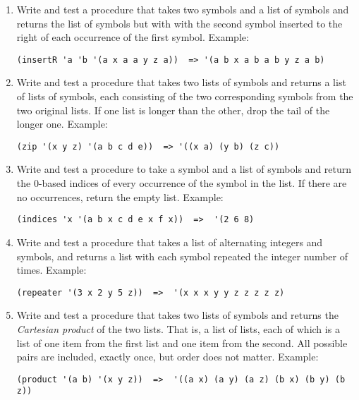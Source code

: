\documentclass[12pt]{article}
\newcommand{\li}{\item}
\begin{document}
\begin{enumerate}
\li Write and test a procedure that takes two symbols and a list
of symbols and returns the list of symbols but with
with the second symbol inserted to the right of
each occurrence of the first symbol.  Example:
\begin{lstlisting}
(insertR 'a 'b '(a x a a y z a))  => '(a b x a b a b y z a b)
\end{lstlisting}

\li Write and test a procedure that takes two lists
of symbols and returns a list of lists of symbols,
each consisting of the two 
corresponding symbols from the two original lists.
If one list is longer than the other, drop the tail of
the longer one.
 Example:
\begin{lstlisting}
(zip '(x y z) '(a b c d e))  => '((x a) (y b) (z c))
\end{lstlisting}

\li Write and test a procedure to take a symbol and a list
of symbols and return the 0-based indices of every occurrence
of the symbol in the list.  If there are no occurrences,
return the empty list.  Example:
\begin{lstlisting}
(indices 'x '(a b x c d e x f x))  =>  '(2 6 8) 
\end{lstlisting}

\li Write and test a procedure that takes a list
of alternating integers and symbols, and returns a list
with each symbol repeated the integer number of times.
Example:
\begin{lstlisting}
(repeater '(3 x 2 y 5 z))  =>  '(x x x y y z z z z z)
\end{lstlisting}

\li Write and test a procedure that takes two lists
of symbols and returns the {\em Cartesian product} of
the two lists.  That is, a list of lists, each of which
is a list of one item from the first list and one item
from the second.  All possible pairs are included, exactly once,
but order does not matter.
Example:
\begin{lstlisting}
(product '(a b) '(x y z))  =>  '((a x) (a y) (a z) (b x) (b y) (b z))
\end{lstlisting}

\end{enumerate}
\end{document}
